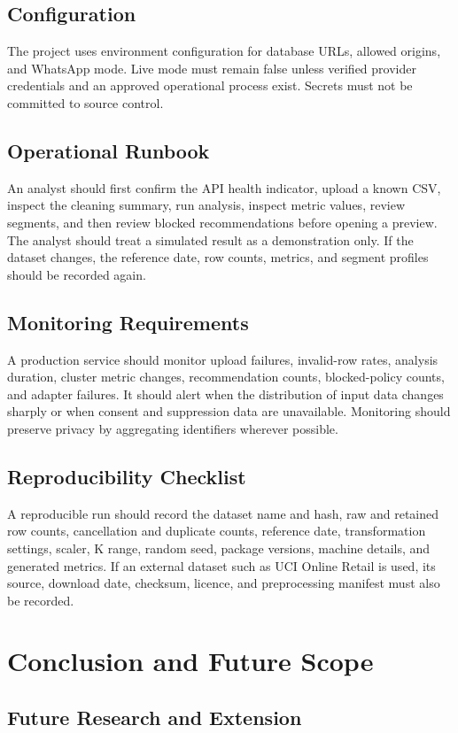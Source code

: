 \documentclass[12pt,a4paper]{report}
\begin{document}
\section{Configuration}
The project uses environment configuration for database URLs, allowed origins, and WhatsApp mode. Live mode must remain false unless verified provider credentials and an approved operational process exist. Secrets must not be committed to source control.

\section{Operational Runbook}
An analyst should first confirm the API health indicator, upload a known CSV, inspect the cleaning summary, run analysis, inspect metric values, review segments, and then review blocked recommendations before opening a preview. The analyst should treat a simulated result as a demonstration only. If the dataset changes, the reference date, row counts, metrics, and segment profiles should be recorded again.

\section{Monitoring Requirements}
A production service should monitor upload failures, invalid-row rates, analysis duration, cluster metric changes, recommendation counts, blocked-policy counts, and adapter failures. It should alert when the distribution of input data changes sharply or when consent and suppression data are unavailable. Monitoring should preserve privacy by aggregating identifiers wherever possible.

\section{Reproducibility Checklist}
A reproducible run should record the dataset name and hash, raw and retained row counts, cancellation and duplicate counts, reference date, transformation settings, scaler, K range, random seed, package versions, machine details, and generated metrics. If an external dataset such as UCI Online Retail is used, its source, download date, checksum, licence, and preprocessing manifest must also be recorded.

\chapter{Conclusion and Future Scope}
\section{Future Research and Extension}
\end{document}
